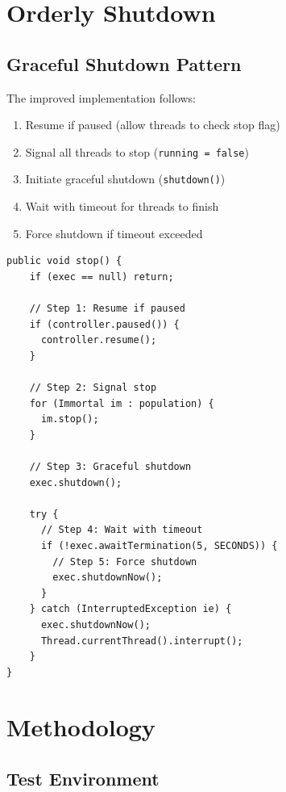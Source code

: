 \documentclass[10pt,a4paper,twocolumn]{article}
\begin{document}
\section{Orderly Shutdown}

\subsection{Graceful Shutdown Pattern}

The improved implementation follows:

\begin{enumerate}
    \item Resume if paused (allow threads to check stop flag)
    \item Signal all threads to stop (\texttt{running = false})
    \item Initiate graceful shutdown (\texttt{shutdown()})
    \item Wait with timeout for threads to finish
    \item Force shutdown if timeout exceeded
\end{enumerate}

\begin{lstlisting}[caption={Orderly Shutdown Implementation}]
public void stop() {
    if (exec == null) return;
    
    // Step 1: Resume if paused
    if (controller.paused()) {
      controller.resume();
    }
    
    // Step 2: Signal stop
    for (Immortal im : population) {
      im.stop();
    }
    
    // Step 3: Graceful shutdown
    exec.shutdown();
    
    try {
      // Step 4: Wait with timeout
      if (!exec.awaitTermination(5, SECONDS)) {
        // Step 5: Force shutdown
        exec.shutdownNow();
      }
    } catch (InterruptedException ie) {
      exec.shutdownNow();
      Thread.currentThread().interrupt();
    }
}
\end{lstlisting}

\section{Methodology}

\subsection{Test Environment}
\end{document}
